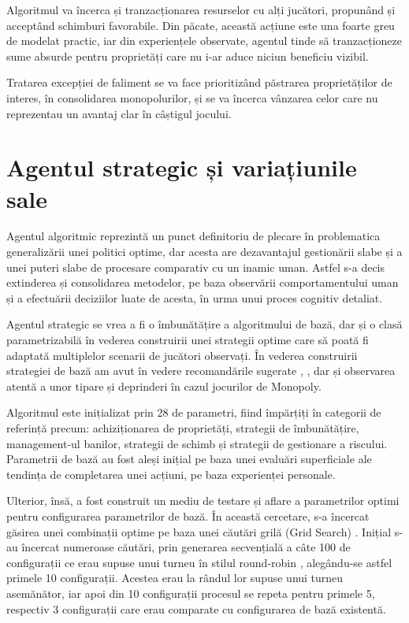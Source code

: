 Algoritmul va încerca și tranzacționarea resurselor cu alți jucători, propunând și acceptând schimburi favorabile. Din păcate, această acțiune este una foarte greu de modelat practic, iar din experiențele observate, agentul tinde să tranzacționeze sume absurde pentru proprietăți care nu i-ar aduce niciun beneficiu vizibil.

Tratarea excepției de faliment se va face prioritizând păstrarea proprietăților de interes, în consolidarea monopolurilor, și se va încerca vânzarea celor care nu reprezentau un avantaj clar în câștigul jocului.

\section{Agentul strategic și variațiunile sale}
Agentul algoritmic reprezintă un punct definitoriu de plecare în problematica generalizării unei politici optime, dar acesta are dezavantajul gestionării slabe și a unei puteri slabe de procesare comparativ cu un inamic uman. Astfel s-a decis extinderea și consolidarea metodelor, pe baza observării comportamentului uman și a efectuării deciziilor luate de acesta, în urma unui proces cognitiv detaliat.

Agentul strategic se vrea a fi o îmbunătățire a algoritmului de bază, dar și o clasă parametrizabilă în vederea construirii unei strategii optime care să poată fi adaptată multiplelor scenarii de jucători observați. În vederea construirii strategiei de bază am avut în vedere recomandările sugerate \cite{holborn2022monopoly}, \cite{cahn2025monopoly}, dar și observarea atentă a unor tipare și deprinderi în cazul jocurilor de Monopoly.

Algoritmul este inițializat prin 28 de parametri, fiind împărțiți în categorii de referință precum: achiziționarea de proprietăți, strategii de îmbunătățire, management-ul banilor, strategii de schimb și strategii de gestionare a riscului. Parametrii de bază au fost aleși inițial pe baza unei evaluări superficiale ale tendința de completarea unei acțiuni, pe baza experienței personale.

Ulterior, însă, a fost construit un mediu de testare și aflare a parametrilor optimi pentru configurarea parametrilor de bază. În această cercetare, s-a încercat găsirea unei combinații optime pe baza unei căutări grilă (Grid Search) \cite{sklearn_gridsearch}. Inițial s-au încercat numeroase căutări, prin generarea secvențială a câte 100 de configurații ce erau supuse unui turneu în stilul round-robin \cite{wikipedia_roundrobin}, alegându-se astfel primele 10 configurații. Acestea erau la rândul lor supuse unui turneu asemănător, iar apoi din 10 configurații procesul se repeta pentru primele 5, respectiv 3 configurații care erau comparate cu configurarea de bază existentă.

